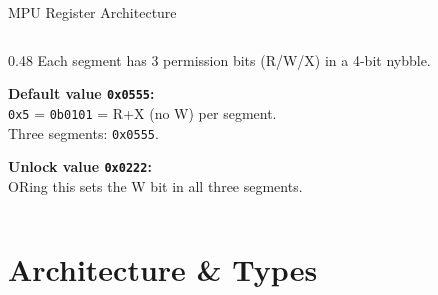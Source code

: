 \documentclass[aspectratio=169, 10pt]{beamer}
\begin{document}
\begin{frame}{MPU Register Architecture}
\begin{columns}[T]
\begin{column}{0.48\textwidth}
\vspace{0.3em}
\small
Each segment has 3 permission bits (R/W/X) in a 4-bit nybble.

\vspace{0.3em}
\textbf{Default value \texttt{0x0555}:}\\
\texttt{0x5} = \texttt{0b0101} = R+X (no W) per segment.\\
Three segments: \texttt{0x0555}.

\vspace{0.3em}
\textbf{Unlock value \texttt{0x0222}:}\\
ORing this sets the W bit in all three segments.
\end{column}
\end{columns}
\end{frame}

\section{Architecture \& Types}
\end{document}
